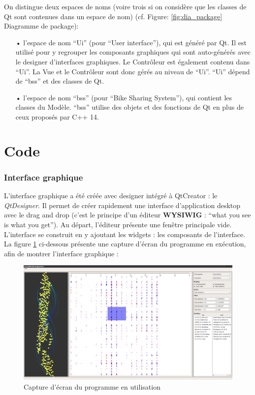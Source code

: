 \documentclass[12pt]{article}
\begin{document}
		On distingue deux espaces de noms (voire trois si on considère que les classes de
		Qt sont contenues dans un espace de nom) (cf. Figure: \ref{fig:dia_package} Diagramme de
		package):\\
	
		\begin{itemize}
		\item[•] l’espace de nom “Ui” (pour “User interface”), qui est généré par Qt.
		Il est utilisé pour y regrouper les composants graphiques qui sont auto-générés avec
		le designer d’interfaces graphiques. Le Contrôleur est également contenu dans “Ui”.
		La Vue et le Contrôleur sont donc gérés au niveau de “Ui”. “Ui” dépend de “bss” et des
		classes de Qt.\\
		
		\item[•]l’espace de nom “bss” (pour “Bike Sharing System”), qui contient les classes
		du Modèle. “bss” utilise des objets et des fonctions de Qt en plus de ceux proposés
		par C++ 14.
		\end{itemize}

\clearpage
\newpage
\part{Code}
	\section{Interface graphique}
	L’interface graphique a été créée avec designer intégré à QtCreator : le \textit{QtDesigner}. Il permet de créer rapidement une interface d’application desktop avec le drag and drop (c’est le principe d’un éditeur \textbf{WYSIWIG} : “what you see is what you get”). Au départ, l’éditeur présente une fenêtre principale vide. L’interface se construit en y ajoutant les widgets : les composants de l’interface.\\

	La figure \ref{fig:screen_final} ci-dessous présente une capture d’écran du programme en exécution, afin de montrer l’interface graphique :\\

	\begin{figure}[!h]
	\begin{center}
	\includegraphics[scale=.25]{screen_final_2.png}
	\caption{Capture d’écran du programme en utilisation}
	\label{fig:screen_final}
	\end{center}
	\end{figure}
	
\end{document}
